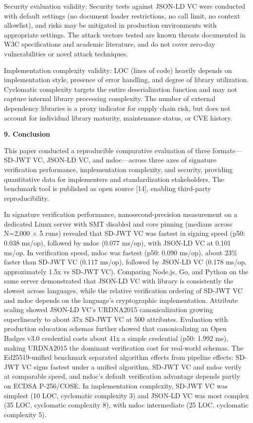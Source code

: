 Security evaluation validity: Security tests against JSON-LD VC were conducted with default settings (no document loader restrictions, no call limit, no context allowlist), and risks may be mitigated in production environments with appropriate settings. The attack vectors tested are known threats documented in W3C specifications and academic literature, and do not cover zero-day vulnerabilities or novel attack techniques.

Implementation complexity validity: LOC (lines of code) heavily depends on implementation style, presence of error handling, and degree of library utilization. Cyclomatic complexity targets the entire deserialization function and may not capture internal library processing complexity. The number of external dependency libraries is a proxy indicator for supply chain risk, but does not account for individual library maturity, maintenance status, or CVE history.

\textbf{9. Conclusion}

This paper conducted a reproducible comparative evaluation of three formats---SD-JWT VC, JSON-LD VC, and mdoc---across three axes of signature verification performance, implementation complexity, and security, providing quantitative data for implementers and standardization stakeholders. The benchmark tool is published as open source {[}14{]}, enabling third-party reproducibility.

In signature verification performance, nanosecond-precision measurement on a dedicated Linux server with SMT disabled and core pinning (medians across N=2,000 × 5 runs) revealed that SD-JWT VC was fastest in signing speed (p50: 0.038 ms/op), followed by mdoc (0.077 ms/op), with JSON-LD VC at 0.101 ms/op. In verification speed, mdoc was fastest (p50: 0.090 ms/op), about 23\% faster than SD-JWT VC (0.117 ms/op), followed by JSON-LD VC (0.178 ms/op, approximately 1.5x vs SD-JWT VC). Comparing Node.js, Go, and Python on the same server demonstrated that JSON-LD VC with library is consistently the slowest across languages, while the relative verification ordering of SD-JWT VC and mdoc depends on the language's cryptographic implementation. Attribute scaling showed JSON-LD VC's URDNA2015 canonicalization growing superlinearly to about 37x SD-JWT VC at 500 attributes. Evaluation with production education schemas further showed that canonicalizing an Open Badges v3.0 credential costs about 41x a simple credential (p50: 1.992 ms), making URDNA2015 the dominant verification cost for real-world schemas. The Ed25519-unified benchmark separated algorithm effects from pipeline effects: SD-JWT VC signs fastest under a unified algorithm, SD-JWT VC and mdoc verify at comparable speed, and mdoc's default verification advantage depends partly on ECDSA P-256/COSE. In implementation complexity, SD-JWT VC was simplest (10 LOC, cyclomatic complexity 3) and JSON-LD VC was most complex (35 LOC, cyclomatic complexity 8), with mdoc intermediate (25 LOC, cyclomatic complexity 5).

